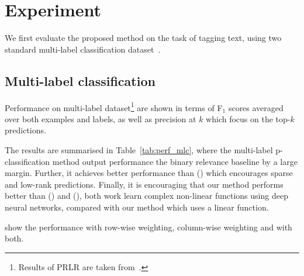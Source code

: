 \section{Experiment}
\label{sec:experiment}

We first evaluate the proposed method on the task of tagging text, 
using two standard multi-label classification dataset~\cite{katakis2008multilabel}.

\subsection{Multi-label classification}

Performance on multi-label dataset\footnote{Results of PRLR are taken from~\citep{lin2014multi}.}
are shown in terms of F$_1$ scores averaged over both examples and labels, 
as well as precision at $k$ which focus on the top-$k$ predictions.

The results are summarised in Table~\ref{tab:perf_mlc},
where the multi-label p-classification method output performance the binary relevance baseline by a large margin.
Further, it achieves better performance than (\citet{lin2014multi}) which encourages sparse and low-rank predictions.
Finally, it is encouraging that our method performs better than (\citet{belanger2016structured}) and (\citet{gygli2017deep}),
both work learn complex non-linear functions using deep neural networks, compared with our method which uses a linear function.

\TODO show the performance with row-wise weighting, column-wise weighting and with both.

\begin{table}[!h]
\centering
\caption{Performance on multi-label dataset}
\label{tab:perf_mlc}
\end{table}



